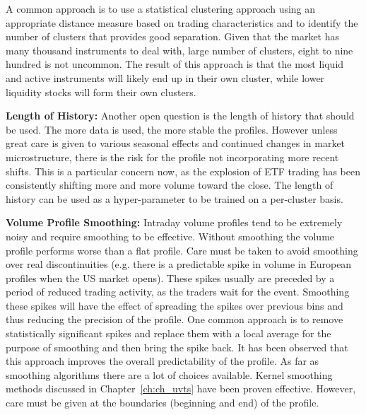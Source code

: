 A common approach is to use a statistical clustering approach using an appropriate distance measure based on trading characteristics and to identify the number of clusters that provides good separation. Given that the market has many thousand instruments to deal with, large number of clusters, eight to nine hundred is not uncommon. The result of this approach is that the most liquid and active instruments will likely end up in their own cluster, while lower liquidity stocks will form their own clusters. \twomedskip


\noindent\textbf{Length of History:} Another open question is the length of history that should be used. The more data is used, the more stable the profiles. However unless great care is given to various seasonal effects and continued changes in market microstructure, there is the risk for the profile not incorporating more recent shifts. This is a particular concern now, as the explosion of ETF trading has been consistently shifting more and more volume toward the close. The length of history can be used as a hyper-parameter to be trained on a per-cluster basis. \twomedskip


\noindent\textbf{Volume Profile Smoothing:} Intraday volume profiles tend to be extremely noisy and require smoothing to be effective. Without smoothing the volume profile performs worse than a flat profile. Care must be taken to avoid smoothing over real discontinuities (e.g. there is a predictable spike in volume in European profiles when the US market opens). These spikes usually are preceded by a period of reduced trading activity, as the traders wait for the event. Smoothing these spikes will have the effect of spreading the spikes over previous bins and thus reducing the precision of the profile. One common approach is to remove statistically significant spikes and replace them with a local average for the purpose of smoothing and then bring the spike back. It has been observed that this approach improves the overall predictability of the profile. As far as smoothing algorithms there are a lot of choices available. Kernel smoothing methods discussed in Chapter~\ref{ch:ch_uvts} have been proven effective. However, care must be given at the boundaries (beginning and end) of the profile. \twomedskip


